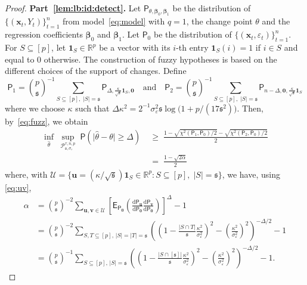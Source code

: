 \documentclass[11pt, a4paper]{article}
\newcommand{\mbf}{\mathbf}
\newcommand{\mc}{\mathcal}
\newcommand{\vep}{\varepsilon}
\renewcommand{\l}{\left}
\renewcommand{\r}{\right}
\def\wh{\widehat}
\newcommand{\E}[0]{\mathsf{E}}
\newcommand{\p}{\mathsf{P}}
\newcommand{\R}{\mathbb{R}}
\theoremstyle{definition}
\theoremstyle{definition}
\theoremstyle{definition}
\theoremstyle{definition}
\theoremstyle{definition}
\theoremstyle{remark}
\theoremstyle{definition}
\theoremstyle{definition}
\theoremstyle{definition}
\begin{document}
\begin{proof}
\bigskip

{\bf Part~\ref{lem:lb:id:detect}.} Let $\p_{\theta, \bm\beta_0, \bm\beta_1}$ be the distribution of $\{(\mbf x_t, Y_t)\}_{t=1}^n$ from model~\eqref{eq:model} with $q = 1$, the change point $\theta$ and the regression coefficients $\bm \beta_0$ and $\bm\beta_1$. Let $\p_0$ be the distribution of $\{(\mbf x_t, \vep_t)\}_{t = 1}^n$. 
For $S \subseteq [p]$, let $\mathbf{1}_S \in \R^p$ be a vector with its $i$-th entry $\mathbf{1}_S(i) = 1$ if $i \in S$ and equal to $0$ otherwise.  The construction of fuzzy hypotheses is based on the different choices of the support of changes. Define 
\[
\p_1 = {p \choose \mathfrak{s}}^{-1} \sum_{S\subseteq [p],\; \vert S \vert = \mathfrak{s}}\p_{\Delta, \frac{\kappa}{\sqrt{\mathfrak{s}}}\mathbf{1}_S, \bm 0}\quad\text{and}\quad
\p_2 = {p \choose \mathfrak{s}}^{-1} \sum_{S\subseteq [p],\; \vert S \vert = \mathfrak{s}}\p_{n-\Delta, \bm 0, \frac{\kappa}{\sqrt{\mathfrak{s}}}\mathbf{1}_S}
\]
where we choose $\kappa$ such that $\Delta\kappa^2 = 2^{-1} \sigma_{\vep}^2\mathfrak{s} \log\bigl(1 + {p}/({17\mathfrak{s}^2})\bigr)$. Then, by~\eqref{eq:fuzz}, we obtain 
\begin{align*}
\inf_{\wh\theta}\; \sup_{\mc P_{\mathfrak{s}, \sigma_{\vep}}^{\tau, n, p}} \;\p\l(\bigl\vert\wh\theta -\theta\bigr\vert \ge \Delta\r)\; &
\ge\; \frac{1- \sqrt{\chi^2(\p_{1},\p_0)/2} - \sqrt{\chi^2(\p_{2},\p_0)/2}}{2}\\
& = \; \frac{1-\sqrt{2\alpha}}{2}
\end{align*}
where, with $\mathcal{U} = \bigl\{\bm{u} = ({\kappa}/{\sqrt{\mathfrak{s}}})\mathbf{1}_S \in \R^p:  S \subseteq [p],  \; \vert S \vert = \mathfrak{s} \bigr\}$, 
we have, using \eqref{eq:uv},
\begin{align*}
\alpha &= {p \choose \mathfrak{s}}^{-2}\sum_{\bm u, \bm v \in \mc U} \l[\E_{\p_{\bm0}}\l(\frac{\mathrm{d}\p_{\bm u}}{\mathrm{d}\p_{\bm 0}}\frac{\mathrm{d}\p_{\bm v}}{\mathrm{d}\p_{\bm 0}}\r)\r]^{\Delta} - 1 \\
& = {p \choose \mathfrak{s}}^{-2}\sum_{S, T \subseteq [p],\, \vert S\vert = \vert T\vert = \mathfrak{s}} \l(\l(1-\frac{\vert S \cap T \vert}{\mathfrak{s}}\frac{\kappa^2}{\sigma_{\vep}^2}\r)^2 - \l(\frac{\kappa^2}{\sigma_{\vep}^2}\r)^2\r)^{-\Delta/2} - 1\\
& = {p \choose \mathfrak{s}}^{-1}\sum_{S \subseteq [p],\, \vert S\vert = \mathfrak{s}} \l(\l(1-\frac{\vert S \cap [\mathfrak{s}] \vert}{\mathfrak{s}}\frac{\kappa^2}{\sigma_{\vep}^2}\r)^2 - \l(\frac{\kappa^2}{\sigma_{\vep}^2}\r)^2\r)^{-\Delta/2} - 1.
\end{align*}

\end{proof}
\end{document}
